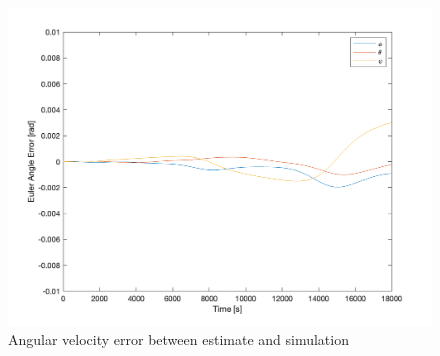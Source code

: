 \begin{figure}[H]
\centering
\includegraphics[scale=0.6]{Images/ps7_problem6_angle_err.png}
\caption{Angular velocity error between estimate and simulation}
\label{fig:ps7_problem5a_angvel_sim}
\end{figure}
